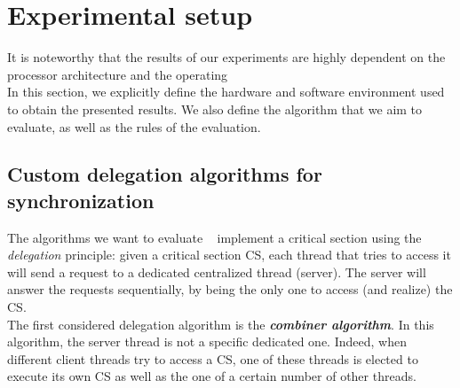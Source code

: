 \documentclass[10pt]{article}											%
\begin{document}









\section{Experimental setup}\label{experimentalSetup}
It is noteworthy that the results of our experiments are highly dependent on the processor architecture and the operating\\
In this section, we explicitly define the hardware and software environment used to obtain the presented results.   We also define the algorithm that we aim to evaluate, as well as the rules of the evaluation.\\

\subsection{Custom delegation algorithms for synchronization}\label{delegationSynchronizationAlgo_description}
The algorithms we want to evaluate ~\cite{delegationCS_roparsPetrovic} implement a critical section using the \emph{delegation} principle: given a critical section CS, each thread that tries to access it will send a request to a dedicated centralized thread (server).   The server will answer the requests sequentially, by being the only one to access (and realize) the CS.\\

The first considered delegation algorithm is the \textbf{\textit{combiner algorithm}}.  In this algorithm, the server thread is not a specific dedicated one.   Indeed, when different client threads try to access a CS, one of these threads is elected to execute its own CS as well as the one of a certain number of other threads.\\
\end{document}
